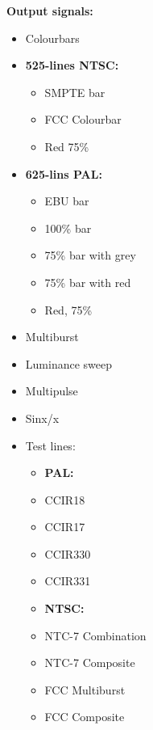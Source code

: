 \textbf{Output signals:}


\begin{itemize}

\setlength{\itemsep}{1pt}
\setlength{\parskip}{0pt}

\item Colourbars

\item \textbf{525-lines NTSC:}
\begin{itemize}
\item SMPTE bar
\item FCC Colourbar
\item Red 75\%
\end{itemize}

\item \textbf{625-lins PAL:}
\begin{itemize}
\item EBU bar
\item 100\% bar
\item 75\% bar with grey
\item 75\% bar with red
\item Red, 75\%
\end{itemize}

\item Multiburst
\item Luminance sweep
\item Multipulse
\item Sinx/x
\item Test lines:
\begin{itemize}
\item \textbf{PAL:}
\item CCIR18
\item CCIR17
\item CCIR330
\item CCIR331
\item \textbf{NTSC:}
\item NTC-7 Combination
\item NTC-7 Composite
\item FCC Multiburst
\item FCC Composite
\end{itemize}


\end{itemize}
